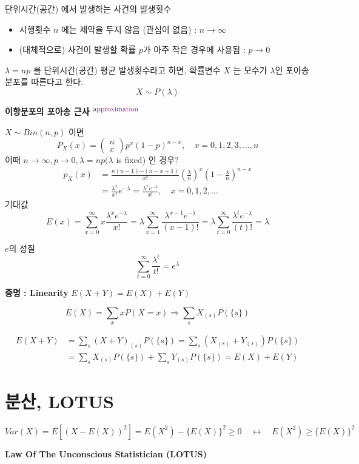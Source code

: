 \documentclass{oblivoir}
\newcommand{\DC}[1]{\textcolor{DarkMagenta}{#1}}%
\newcommand{\UP}[1]{$^{\mbox{\DC{\footnotesize #1}}}$}
\newcommand{\mat}[2]{\begin{pmatrix} #1 \\ #2 \end{pmatrix}}
\begin{document}
단위시간(공간) 에서 발생하는 사건의 발생횟수
\begin{itemize}
\item 시행횟수 $n$ 에는 제약을 두지 않음 (관심이 없음) : $n \rightarrow \infty$
\item (대체적으로) 사건이 발생할 확률 $p$가 아주 작은 경우에 사용됨 : $p \rightarrow 0$
\end{itemize}
$\lambda = np$ 를 단위시간(공간) 평균 발생횟수라고 하면, 확률변수 $X$ 는 모수가 $\lambda$인 포아송 분포를 따른다고 한다.
$$
X \sim P(\lambda)
$$

\textbf{이항분포의 포아송 근사 \UP{approximation}}

$X \sim Bin(n,p)$ 이면
$$
P_X(x) = \mat{n}{x}p^x (1-p)^{n-x}, \quad x = 0,1,2,3,\ldots,n
$$
이때 $n \rightarrow \infty, p \rightarrow 0, \lambda = np(\lambda$ is fixed) 인 경우?
\begin{align*}
p_X(x) &= \frac{n(n-1)\cdots(n-x+1)}{x!} \left (\frac{\lambda}{n} \right)^x \left(1-\frac{\lambda}{n} \right)^{n-x} \\
&= \frac{\lambda^x}{x!} e^{-\lambda} = \frac{\lambda^x e^{-\lambda}}{x!}, \quad x = 0,1,2,\ldots
\end{align*}
기대값
$$
E(x) = \sum_{x=0}^{\infty} x \frac{\lambda^x e^{-\lambda}}{x!} = \lambda \sum_{x=1}^{\infty} \frac{\lambda^{x-1} e^{-\lambda}}{(x-1)!}
= \lambda \sum_{t=0}^{\infty} \frac{\lambda^{t} e^{-\lambda}}{(t)!} = \lambda
$$
\begin{myframe}{$e$의 성질}
$$
\sum_{t = 0}^{\infty} \frac{\lambda^t}{t!} = e^{\lambda}
$$
\end{myframe}
\textbf{증명 : Linearity} $E(X + Y) = E(X) + E(Y)$
\begin{myframe}{}
$$
E(X) = \sum_x x P(X=x) \Rightarrow \sum_s X_{(s)} P(\{s\})
$$
\end{myframe}
\begin{align*}
E(X + Y) &= \sum_s (X+Y)_{(s)} P(\{s\}) = \sum_s (X_{(s)}+Y_{(s)}) P(\{s\}) \\
&=\sum_s X_{(s)} P(\{s\}) + \sum_s Y_{(s)} P(\{s\}) = E(X) + E(Y)
\end{align*}

\section{분산, LOTUS}
$$
Var(X) = E[(X - E(X))^2] = E(X^2) - \{E(X)\}^2 \geq 0 \quad \leftrightarrow \quad E(X^2) \geq \{E(X)\}^2 
$$

\textbf{Law Of The Unconscious Statistician (LOTUS)}
\end{document}
